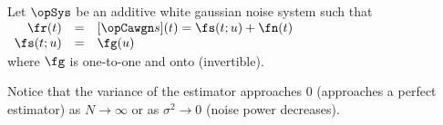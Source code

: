 \begin{theorem}
\label{thm:estML-CR}
Let $\opSys$ be an additive white gaussian noise system
such that
$\begin{array}[t]{rcl}
   \fr(t)     &=& [\opCawgn s](t) = \fs(t;u) + \fn(t) \\
   \fs(t;u)   &=& \fg( u )
\end{array}$\\
where $\fg$ is one-to-one and onto (invertible).
\\
\end{theorem}

Notice that the variance of the estimator approaches $0$
(approaches a perfect estimator) as $N\to\infty$
or as $\sigma^2\to 0$ (noise power decreases).


